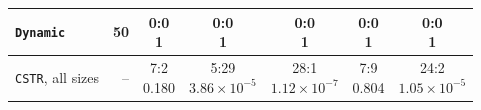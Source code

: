 \begin{tabular}{@{}lrccccc@{}}
\texttt{Dynamic} & 50 & \makecell{0:0\\1} & \makecell{0:0\\1} & \makecell{0:0\\1} & \makecell{0:0\\1} & \makecell{0:0\\1} \\
\midrule
\texttt{CSTR}, all sizes & -- & \makecell{7:2\\0.180} & \makecell{5:29\\\(3.86\times10^{-5}\)} & \makecell{28:1\\\(1.12\times10^{-7}\)} & \makecell{7:9\\0.804} & \makecell{24:2\\\(1.05\times10^{-5}\)} \\
\bottomrule\end{tabular}
